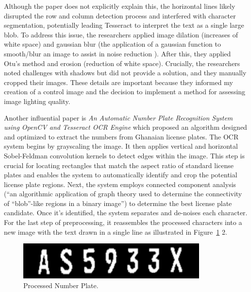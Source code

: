 \documentclass[10pt,twocolumn]{article}
\begin{document}
Although the paper does not explicitly explain this, the horizontal lines likely disrupted the row and column detection process and interfered with character segmentation, potentially leading Tesseract to interpret the text as a single large blob. To address this issue, the researchers applied image dilation (increases of white space\cite{cv_dilate}) and gaussian blur (the application of a gaussian function to smooth/blur an image to assist in noise reduction\cite{cv_dilate} \cite{medium_gauss}). After this, they applied Otu’s method and erosion (reduction of white space\cite{cv_dilate}). Crucially,  the researchers noted challenges with shadows but did not provide a solution, and they manually cropped their images\cite{food}. These details are important because they informed my creation of a control image and the decision to implement a method for assessing image lighting quality.
    
Another influential paper is \textit{An Automatic Number Plate Recognition System using OpenCV and Tesseract OCR Engine} which proposed an algorithm designed and optimized to extract the numbers from Ghanaian license plates. The OCR system begins by grayscaling the image. It then applies vertical and horizontal Sobel-Feldman convolution kernels to detect edges within the image\cite{automatic}. This step is crucial for locating rectangles that match the aspect ratio of standard license plates and enables the system to automatically identify and crop the potential license plate regions. Next, the system employs connected component analysis (“an algorithmic application of graph theory used to determine the connectivity of “blob”-like regions in a binary image”\cite{CCA}) to determine the best license plate candidate. Once it’s identified, the system separates and de-noises each character. For the last step of preprocessing, it reassembles the processed characters into a new image with the text drawn in a single line as illustrated in Figure~\ref{fig:plate} 2\cite{automatic}. 
\begin{figure}[h!]
    \centering
    \includegraphics[width=\linewidth]{Figures/plate_fig.png}
    \caption{Processed Number Plate.}
    \label{fig:plate}
\end{figure}
\end{document}

